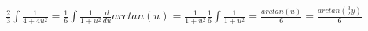 \documentclass[preview]{standalone}
\begin{document}
\begin{align*}
\frac{2}{3} \int \frac{1}{4+4u^2} = \frac{1}{6} \int \frac{1}{1+u^2} \frac{d}{du} arctan(u) = \frac{1}{1+u^2} \frac{1}{6} \int \frac{1}{1+u^2} = \frac{arctan(u)}{6} = \frac{arctan(\frac{3}{2}y)}{6}
\end{align*}
\end{document}
